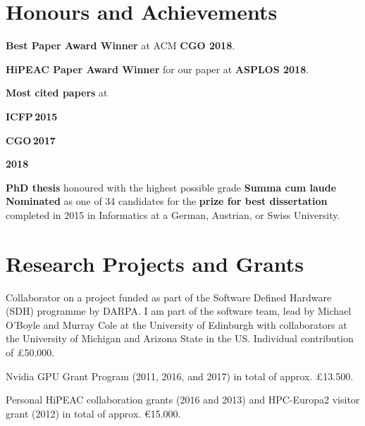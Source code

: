 \documentclass[11pt,a4paper]{moderncv}
\newcommand{\strong}[1]{\textcolor{color1}{\textbf{#1}}}
\newcommand{\highlight}[1]{\textcolor{color1}{#1}}
\begin{document}
\section{Honours and Achievements}
\begin{cvitemize}
    \item \strong{Best Paper Award Winner} at ACM \strong{CGO 2018}.
    \item \strong{HiPEAC Paper Award Winner} for our paper at \strong{ASPLOS 2018}.
    \item \strong{Most cited papers} at
        \begin{inlineItemize}
        \item \strong{ICFP\,2015}
        \item \strong{CGO\,2017}
        \item \strong{2018}
        \end{inlineItemize}
    \item \strong{PhD thesis} honoured with the highest possible grade \strong{Summa cum laude}\newline
          \strong{Nominated} as one of 34 candidates for the \strong{prize for best dissertation} completed in 2015 in Informatics at a German, Austrian, or Swiss University.
\end{cvitemize}

\section{Research Projects and Grants}
\begin{cvitemize}
    \item Collaborator on a project funded as part of the Software Defined Hardware (SDH) programme by DARPA. I am part of the software team, lead by Michael O'Boyle and Murray Cole at the University of Edinburgh with collaborators at the University of Michigan and Arizona State in the US.
      Individual contribution of \highlight{£50.000}.
    \item Nvidia GPU Grant Program (2011, 2016, and 2017) in total of approx. \highlight{£13.500}.
    \item Personal HiPEAC collaboration grants (2016 and 2013) and HPC-Europa2 visitor grant (2012) in total of approx. \highlight{€15.000}.
\end{cvitemize}
\end{document}
